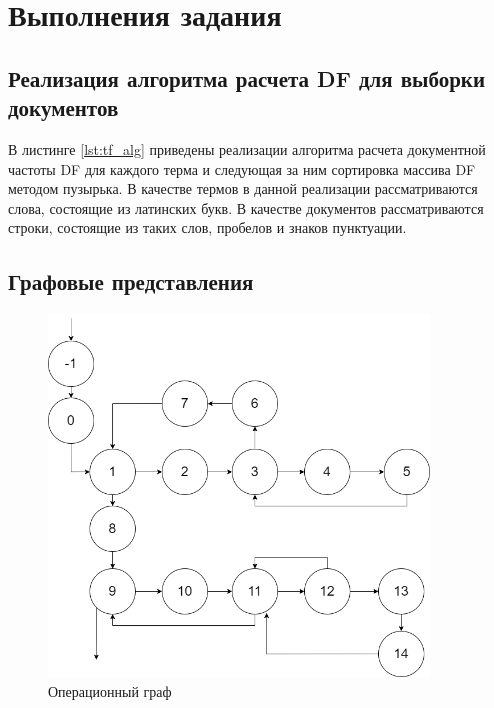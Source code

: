 \chapter{Выполнения задания}

\section{Реализация алгоритма расчета DF для выборки документов}

В листинге \ref{lst:tf_alg} приведены реализации алгоритма расчета документной частоты DF для каждого терма и следующая за ним сортировка массива DF методом пузырька. В качестве термов в данной реализации рассматриваются слова, состоящие из латинских букв. В качестве документов рассматриваются строки, состоящие из таких слов, пробелов и знаков пунктуации.

\clearpage


\clearpage
\section{Графовые представления}

\begin{figure}[h]
	\centering
	\includegraphics[width=0.9\textwidth]{img/dz-Граф управления.drawio.png}
	\caption{Операционный граф}
	\label{fig:g1}
\end{figure}

